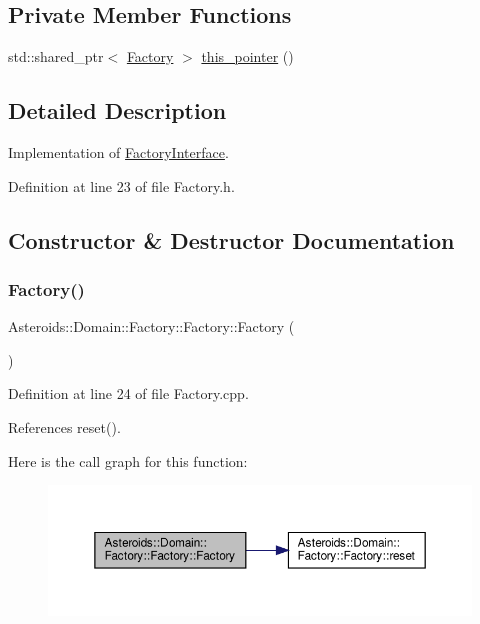 \subsection*{Private Member Functions}
\begin{DoxyCompactItemize}
\item 
std\+::shared\+\_\+ptr$<$ \hyperlink{classAsteroids_1_1Domain_1_1Factory_1_1Factory}{Factory} $>$ \hyperlink{classAsteroids_1_1Domain_1_1Factory_1_1Factory_a9fcc5e21b7009846e744564a60b45619}{this\+\_\+pointer} ()
\end{DoxyCompactItemize}


\subsection{Detailed Description}
Implementation of \hyperlink{classAsteroids_1_1Domain_1_1Factory_1_1FactoryInterface}{Factory\+Interface}. 

Definition at line 23 of file Factory.\+h.



\subsection{Constructor \& Destructor Documentation}
\mbox{\label{classAsteroids_1_1Domain_1_1Factory_1_1Factory_a988bf74b46cff282611c6a52c6937a94}} 
\subsubsection{\texorpdfstring{Factory()}{Factory()}}
{\footnotesize\ttfamily Asteroids\+::\+Domain\+::\+Factory\+::\+Factory\+::\+Factory (\begin{DoxyParamCaption}{ }\end{DoxyParamCaption})}



Definition at line 24 of file Factory.\+cpp.



References reset().

Here is the call graph for this function\+:\nopagebreak
\begin{figure}[H]
\begin{center}
\leavevmode
\includegraphics[width=350pt]{classAsteroids_1_1Domain_1_1Factory_1_1Factory_a988bf74b46cff282611c6a52c6937a94_cgraph}
\end{center}
\end{figure}


